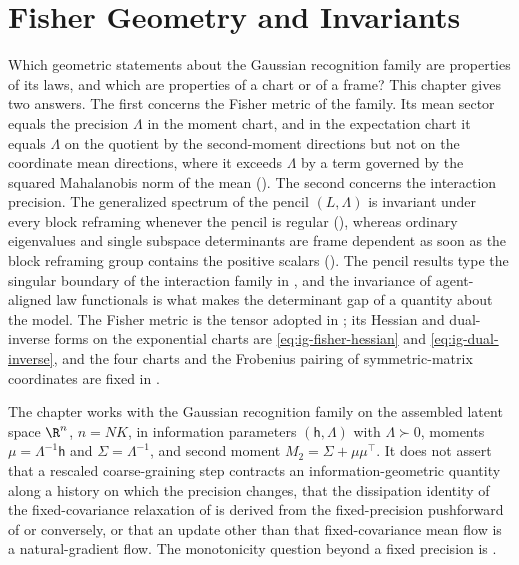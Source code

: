 \chapter{Fisher Geometry and Invariants}
\label{ch:infogeometry}

Which geometric statements about the Gaussian recognition family are properties
of its laws, and which are properties of a chart or of a frame? This chapter
gives two answers. The first concerns the Fisher metric of the family. Its mean
sector equals the precision \(\Lambda\) in the moment chart, and in the
expectation chart it equals \(\Lambda\) on the quotient by the second-moment
directions but not on the coordinate mean directions, where it exceeds
\(\Lambda\) by a term governed by the squared Mahalanobis norm of the mean
(). The second concerns the interaction
precision. The generalized spectrum of the pencil \((L,\Lambda)\) is invariant
under every block reframing whenever the pencil is regular
(), whereas ordinary eigenvalues and single
subspace determinants are frame dependent as soon as the block reframing group
contains the positive scalars ().
The pencil results type the singular boundary of the interaction family in
, and the invariance of agent-aligned law
functionals is what makes the determinant gap of
 a quantity about the model. The Fisher
metric is the tensor adopted in ; its Hessian and
dual-inverse forms on the exponential charts are
\eqref{eq:ig-fisher-hessian} and \eqref{eq:ig-dual-inverse}, and the four charts
and the Frobenius pairing of symmetric-matrix coordinates are fixed in
.

The chapter works with the Gaussian recognition family on the assembled latent
space \(\R^n\), \(n=NK\), in information parameters
\((\mathsf h,\Lambda)\) with \(\Lambda\succ0\), moments
\(\mu=\Lambda^{-1}\mathsf h\) and \(\Sigma=\Lambda^{-1}\), and second moment
\(M_2=\Sigma+\mu\mu^\top\). It does not assert that a rescaled coarse-graining
step contracts an information-geometric quantity along a history on which the
precision changes, that the dissipation identity of the fixed-covariance
relaxation of  is derived from the
fixed-precision pushforward of  or
conversely, or that an update other than that fixed-covariance mean flow is a
natural-gradient flow.  The monotonicity question beyond a
fixed precision is .

